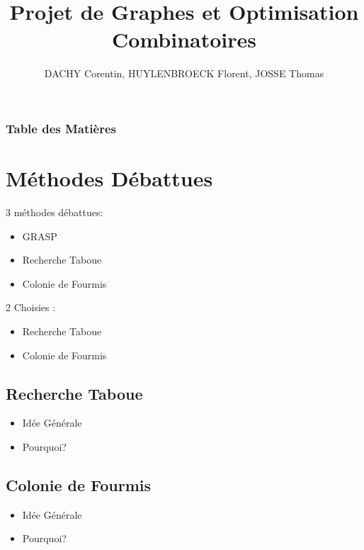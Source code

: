 \documentclass[b]{beamer}
\title[Projet de Graphes et Optimisation Combinatoire]{Projet de Graphes et Optimisation Combinatoires}
\author{DACHY Corentin, HUYLENBROECK Florent, JOSSE Thomas}
\begin{document}
\begin{frame}
	\titlepage
\end{frame}

\begin{frame}
	\frametitle{Table des Matières}
	\tableofcontents
\end{frame}
\section{Méthodes Débattues}
\begin{frame}
	
	3 méthodes débattues:
	\begin{itemize}
		\item GRASP
		\item Recherche Taboue
		\item Colonie de Fourmis
	\end{itemize}
	2 Choisies :
		\begin{itemize}
			\item Recherche Taboue
			\item Colonie de Fourmis
		\end{itemize}
\end{frame}

\subsection{Recherche Taboue}
\begin{frame}
	\begin{itemize}
		\item Idée Générale
		\item Pourquoi?
	\end{itemize}
\end{frame}
\subsection{Colonie de Fourmis}
\begin{frame}
	\begin{itemize}
		\item Idée Générale
		\item Pourquoi?
	\end{itemize}
\end{frame}
\end{document}
